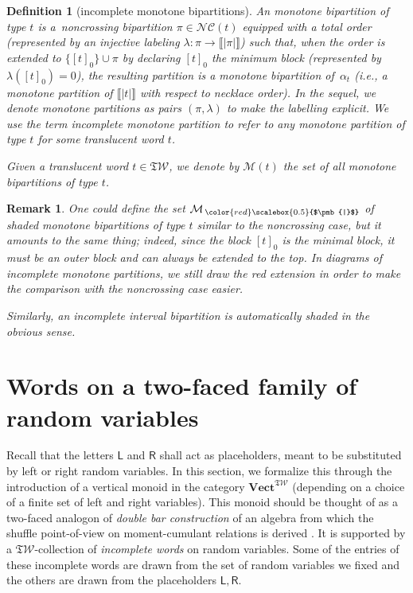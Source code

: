 \documentclass[pdftex]{sigma}
\newcommand{\interval}[1]{\llbracket #1 \rrbracket}
\newcommand{\SWc}{{\mathfrak{T}\mathcal{W}}}
\newcommand{\BNCc}{\mathcal{N}\mathcal{C}}
\def\MBNCc{{\mathcal{M}}}
\newcommand{\shMBNCc}{\MBNCc_{\,{\color{red}\scalebox{0.5}{$\pmb{|}$}}}}
\newcommand\LL{{\mathsf{L}}}
\newcommand\RR{{\mathsf{R}}}
\newcommand\CAT[1]{\mathbf{#1}}
\newcommand{\Vect}{\CAT{Vect}}
\newcommand\icsw{ \Vect^{\SWc} }
\numberwithin{equation}{section}
\newtheorem{Definition}[Theorem]{Definition}
\newtheorem{Remark}[Theorem]{Remark}
\begin{document}
\begin{Definition}[incomplete monotone bipartitions]
An {\it monotone bipartition of type $t$} is a~noncrossing bipartition $\pi \in \BNCc(t)$ equipped with a total order (represented by an injective labeling $\lambda\colon \pi \to \interval{|\pi|}$) such that, when the order is extended to $\{[t]_{0}\}\cup \pi$ by declaring $[t]_0$ the minimum block (represented by $\lambda([t]_0)=0$), the resulting partition is a monotone bipartition of~$\alpha_t$ (i.e., a monotone partition of $\interval{|t|}$ with respect to necklace order). In the sequel, we denote monotone partitions as pairs $(\pi,\lambda)$ to make the labelling explicit. We use the term \emph{incomplete monotone partition} to refer to any monotone partition of type $t$ for some translucent word $t$.

Given a translucent word $t \in \SWc$, we denote by $\MBNCc(t)$ the set of all monotone bipartitions of type $t$.
\end{Definition}

\begin{Remark}One could define the set $\shMBNCc$ of shaded monotone bipartitions of type $t$ similar to the noncrossing case, but it amounts to the same thing; indeed, since the block $[t]_0$ is the minimal block, it must be an outer block and can always be extended to the top. In diagrams of incomplete monotone partitions, we still draw the red extension in order to make the comparison with the noncrossing case easier.

Similarly, an incomplete interval bipartition is automatically shaded in the obvious sense.
\end{Remark}

\section{Words on a two-faced family of random variables}\label{sec:words}

Recall that the letters $\LL$ and $\RR$ shall act as placeholders, meant to be substituted by left or right random variables.
In this section, we formalize this through the introduction of a vertical monoid in the category $\icsw$ (depending on a choice of a finite set of left and right variables). This monoid should be thought of as a two-faced analogon of
\emph{double bar construction} of an algebra from which the shuffle point-of-view on moment-cumulant relations is derived \cite{ebrahimi2015cumulants}.
It is supported by a $\SWc$-collection of \emph{incomplete words} on random variables. Some of the entries of these {incomplete words} are drawn from the set of random variables we fixed and the others are drawn from the placeholders $\LL,\RR$.
\end{document}
